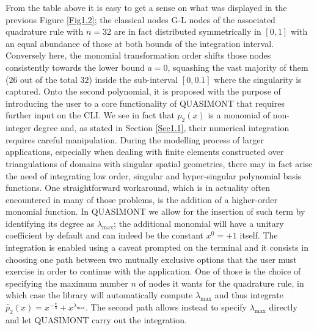 \documentclass[a4paper, twosided]{book}
\begin{document}
\noindent
From the table above it is easy to get a sense on what was displayed in the previous Figure \ref{Fig1.2}; the classical nodes G-L nodes of the associated quadrature rule with $n=32$ are in fact distributed symmetrically in $[0,1]$ with an equal abundance of those at both bounds of the integration interval. Conversely here, the monomial transformation order shifts those nodes consistently towards the lower bound $a=0$, squashing the vast majority of them ($26$ out of the total $32$) inside the sub-interval $[0,0.1]$ where the singularity is captured. Onto the second polynomial, it is proposed with the purpose of introducing the user to a core functionality of QUASIMONT that requires further input on the CLI. We see in fact that $p_2(x)$ is a monomial of non-integer degree and, as stated in Section \ref{Sec1.1}, their numerical integration requires careful manipulation. During the modelling process of larger applications, especially when dealing with finite elements constructed over triangulations of domains with singular spatial geometries, there may in fact arise the need of integrating low order, singular and hyper-singular polynomial basis functions. One straightforward workaround, which is in actuality often encountered in many of those problems, is the addition of a higher-order monomial function. In QUASIMONT we allow for the insertion of such term by identifying its degree as $\lambda_{\text{max}}$; the additional monomial will have a unitary coefficient by default and can indeed be the constant $x^0=+1$ itself. The integration is enabled using a caveat prompted on the terminal and it consists in choosing one path between two mutually exclusive options that the user must exercise in order to continue with the application. One of those is the choice of specifying the maximum number $n$ of nodes it wants for the quadrature rule, in which case the library will automatically compute $\lambda_{\text{max}}$  and thus integrate $\tilde{p_2}(x) = x^{-\frac{e}{3}} + x^{\lambda_\text{max}}$. The second path allows instead to specify $\lambda_{\text{max}}$ directly and let QUASIMONT carry out the integration.
\end{document}
